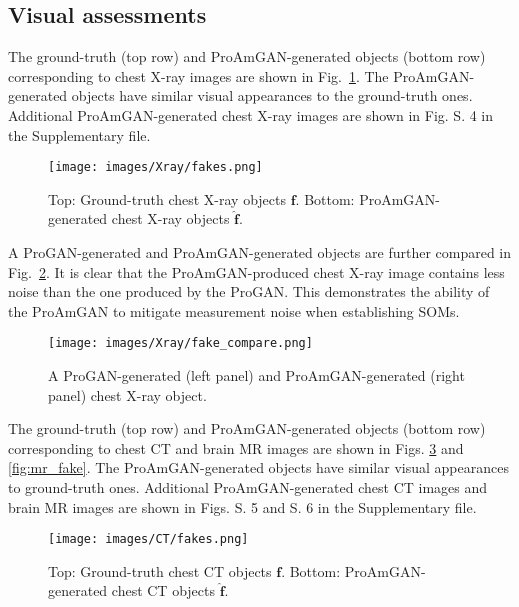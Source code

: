 \documentclass[journal]{IEEEtran}
\renewcommand{\vec}[1]{\mathbf{#1}}
\begin{document}
\subsection{Visual assessments}
The ground-truth  (top row) and ProAmGAN-generated objects (bottom row)
corresponding to chest X-ray images
are shown in Fig.~\ref{fig:x_fake}.
The ProAmGAN-generated objects have similar visual appearances to the ground-truth ones.
Additional ProAmGAN-generated chest X-ray images are shown in Fig. S. 4 in the Supplementary file.
\vspace{-0.3cm}
\begin{figure}[H]
	\centering
	\texttt{[image: images/Xray/fakes.png]}
\caption{Top: Ground-truth chest X-ray objects $\vec{f}$. Bottom: ProAmGAN-generated chest X-ray objects $\hat{\vec{f}}$.}
	\label{fig:x_fake}
 \vspace{-0.5cm}
\end{figure}

A ProGAN-generated and ProAmGAN-generated objects are further compared in Fig.~\ref{fig:progan}.
It is clear that the ProAmGAN-produced chest X-ray image contains less noise than the one produced by the ProGAN.
This demonstrates the ability of the ProAmGAN to mitigate measurement noise when establishing SOMs.
\vspace{-0.3cm}
\begin{figure}[H]
	\centering
	\texttt{[image: images/Xray/fake\_compare.png]}
	\vspace{-0.4cm}
	\caption{A ProGAN-generated (left panel) and ProAmGAN-generated (right panel) chest X-ray object.}
	\label{fig:progan}
\vspace{-0.3cm}
\end{figure}

The ground-truth (top row) and ProAmGAN-generated objects (bottom row) corresponding to chest CT and brain MR images are shown in Figs. \ref{fig:ct_fake} and \ref{fig:mr_fake}. 
The ProAmGAN-generated objects have similar visual appearances to ground-truth ones.
Additional ProAmGAN-generated chest CT images and brain MR images are shown in Figs. S. 5 and S. 6 in the Supplementary file.
\vspace{-0.25cm}
\begin{figure}[H]
	\centering
	\texttt{[image: images/CT/fakes.png]}
	\vspace{-0.4cm}
	\caption{Top: Ground-truth chest CT objects $\vec{f}$. Bottom: ProAmGAN-generated chest CT objects $\hat{\vec{f}}$.}
	\label{fig:ct_fake}
\vspace{-0.25cm}
\end{figure} 
  
\end{document}
